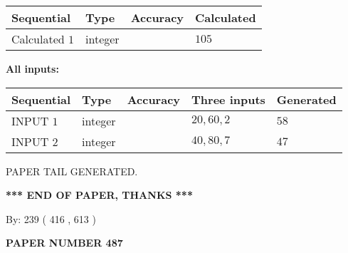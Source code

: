 \documentclass{ctexart}
\begin{document}
   
   
   
\noindent{}
   
   
  
  
\noindent\begin{tabular}{|l|l|l|l|}
\hline
 Sequential & Type & Accuracy & Calculated \\ 
\hline
 
 
  Calculated $  1 $ & integer &  & 
  $ 105 $ 
 \\  \hline  
 \end{tabular}
   
   
   
   
\noindent\vspace{0.1in}\hspace{-0.08in} {\textbf{\Large{All inputs: }}}
   
   
  
  
\noindent\begin{tabular}{|l|l|l|l|l|}
\hline
 Sequential & Type & Accuracy & Three inputs & Generated \\ 
\hline
 
 
  INPUT $  1 $ & integer &  & $
 20
 , 
 60
 , 
 2
 $ & $ 58 $ 
 \\  \hline  
 
 
  INPUT $  2 $ & integer &  & $
 40
 , 
 80
 , 
 7
 $ & $ 47 $ 
 \\  \hline  
 \end{tabular}
   
   
   
   
   
   
 \vspace{0.2in}
 
   
   
\vspace{2.0in} PAPER TAIL GENERATED.
   
   
   
   
\vspace{1.0in} 
{\textbf{\large{ *** END OF PAPER, THANKS *** }}} 
   
   
\hspace{1.0in} By: 
 239 ( 416 ,  613 )
   
   
   
   
\newpage 
\setcounter{page}{ 
   487001 } 
   
   
   
   
 {\textbf{ \Large{ PAPER NUMBER  487  }}}
   
\end{document}
